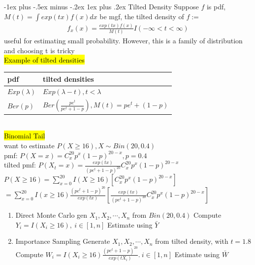\documentclass[a4paper,12pt,landscape]{article}
\makeatletter
\renewcommand{\subsubsection}{\@startsection{subsubsection}{3}{0mm}%
                                {-1ex plus -.5ex minus -.2ex}%
                                {1ex plus .2ex}%
                                {\normalfont\small\bfseries\color{violet}}}
\makeatother
\begin{document}
\begin{multicols}{3}
        \subsubsection{Tilted Density}
        Suppose $f$ is pdf, $M(t) = \int exp(tx)f(x)dx$ be mgf, the tilted density of $f:=$
        \begin{align*}
            f_x(x) = \frac{exp(tx)f(x)}{M(t)}I(-\infty<t<\infty)
        \end{align*}
        useful for estimating small probability. However, this is a family of distribution and choosing t is tricky\\
        \hl{Example of tilted densities}\\
        \begin{tabular}{ll}
            pdf & tilted densities\\
            \hline
            $Exp(\lambda)$ & $Exp(\lambda-t), t < \lambda$\\
            $Ber(p)$ & $Ber(\frac{pe^t}{pe^t+1-p}), M(t)=pe^t+(1-p)$
        \end{tabular}\\
        \hl{Binomial Tail}\\
        want to estimate $P(X\geq 16), X\sim Bin(20, 0.4)$\\
        pmf: $P(X=x)=C_{x}^{20}p^x(1-p)^{20-x}, p=0.4$\\
        tilted pmf: $P(X_t = x) = \frac{exp(tx)}{(pe^t+1-p)^{20}}C_{x}^{20}p^x(1-p)^{20-x}$\\
    $P(X\geq 16) = \sum_{x=0}^{20}I(X\geq16)\left[C_x^{20}p^x(1-p)^{20-x}\right]$\\
    $= \sum_{x=0}^{20}I(x\geq 16)\frac{(pe^t+1-p)^{20}}{exp(tx)}\left[\frac{exp(tx)}{(pe^t+1-p)^{20}}C_x^{20}p^x(1-p)^{20-x}\right]$
        \begin{enumerate}
            \item Direct Monte Carlo
                \subitem[1] gen $X_1, X_2, \cdots, X_n$ from $Bin(20, 0.4)$
                \subitem[2] Compute $Y_i = I(X_i \geq 16), ~i\in[1,n]$
                \subitem[3] Estimate using $\bar Y$
            \item Importance Sampling
                \subitem[1] Generate $X_1, X_2, \cdots, X_n$ from tilted density, with $t=1.8$
                \subitem[2] Compute $W_i = I(X_i\geq16)\frac{(pe^t+1-p)^{20}}{exp(tX_i)}. ~i\in[1, n]$
                \subitem[3] Estimate using $\bar W$
        \end{enumerate}


\end{multicols}
\end{document}
